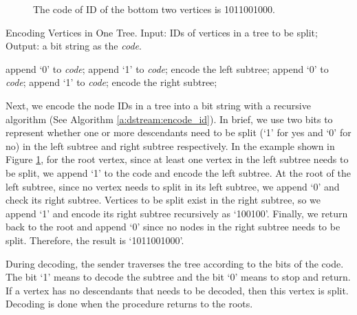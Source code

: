     \begin{figure}
    \centering
    \caption{The code of ID of the bottom two
    vertices is 1011001000. 
    \label{f:dstream:encode_id}}
    \end{figure}
    \begin{algorithm}
    \caption{Encoding Vertices in One Tree.
    Input: IDs of vertices in a tree to be split;
    Output: a bit string as the \emph{code}.\label{a:dstream:encode_id}}
    \begin{algorithmic}
        \STATE append `0' to \emph{code};
    \ELSE
        \STATE append `1' to \emph{code};
        \STATE encode the left subtree;
    \ENDIF
        \STATE append `0' to \emph{code};
    \ELSE
        \STATE append `1' to \emph{code};
        \STATE encode the right subtree;
    \ENDIF
    \end{algorithmic}
    \end{algorithm}
    Next, we encode the node IDs in a tree into a bit string with 
    a recursive algorithm (See Algorithm \ref{a:dstream:encode_id}).
    In brief, we use two bits to represent whether one or more descendants need
    to be split (`1' for yes and `0' for no)
    in the left subtree and right subtree respectively. 
    In the example shown in Figure \ref{f:dstream:encode_id}, for the root vertex, since at least one vertex
    in the left subtree needs to be split, we append `1' to the code and encode the
    left subtree. At the root of the left subtree, since no vertex needs to split in its left
    subtree, we append `0' and check its right subtree. Vertices to be split exist in the right
    subtree, so we append `1' and encode its right subtree recursively as `100100'. 
    Finally, we return back to the root and append `0' since 
    no nodes in the right subtree needs to be split. 
    Therefore, the result is `1011001000'.
        
    During decoding, the sender traverses the tree according to the bits of the code. 
    The bit `1' means to decode the subtree and the bit `0' means to stop and return.
    If a vertex has no descendants that needs to be decoded, then this vertex is split. 
    Decoding is done when the procedure returns to the roots.
    
